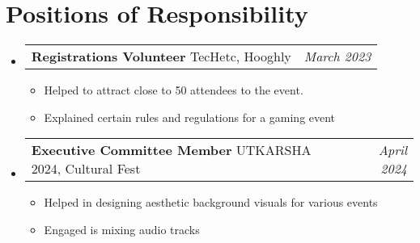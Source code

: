 \documentclass[a4paper,11pt]{article}
\makeatletter
\newcommand{\resumePOR}[3]{
\vspace{0.5mm}\item
    \begin{tabular*}{0.97\textwidth}[t]{l@{\extracolsep{\fill}}r}
        \textbf{#1}\hspace{0.3mm}#2 & \textit{\small{#3}} 
    \end{tabular*}
    \vspace{-2mm}
}
\newcommand{\resumeSubHeadingListStart}{\begin{itemize}[leftmargin=*,labelsep=0mm]}
\newcommand{\resumeItemListStart}{\begin{justify}\begin{itemize}[leftmargin=3ex, rightmargin=2ex, noitemsep,labelsep=1.2mm,itemsep=0mm]\small}
\newcommand{\resumeSubHeadingListEnd}{\end{itemize}\vspace{2mm}}
\newcommand{\resumeItemListEnd}{\end{itemize}\end{justify}\vspace{-2mm}}
\makeatother
\begin{document}
\section{\textbf{Positions of Responsibility}}
\vspace{-0.4mm}
\resumeSubHeadingListStart
\resumePOR{Registrations Volunteer } %
    {TecHetc, Hooghly} %
    {March 2023} %
    \resumeItemListStart
    \item {Helped to attract close to 50 attendees to the event.}
    \item {Explained certain rules and regulations for a gaming event}
    \resumeItemListEnd

\resumeSubHeadingListEnd
\vspace{-5mm}

\vspace{-0.4mm}
\resumeSubHeadingListStart
\resumePOR{Executive Committee Member } %
    {UTKARSHA 2024, Cultural Fest} %
    {April 2024} %
    \resumeItemListStart
    \item {Helped in designing aesthetic background visuals for various events}
    \item {Engaged is mixing audio tracks}
    \resumeItemListEnd

\resumeSubHeadingListEnd
\vspace{-5mm}




    



\end{document}
